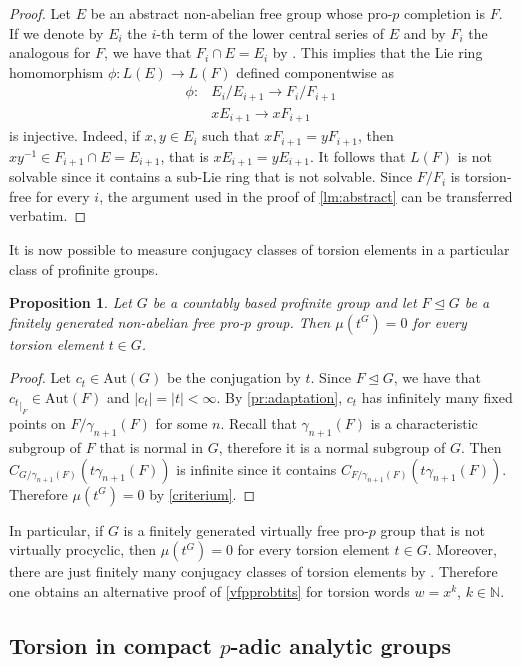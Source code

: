 \documentclass[a4paper,10pt]{amsart}
\theoremstyle{plain}
\newtheorem{proposition}[thm]{Proposition}
\theoremstyle{definition}
\newcommand{\bbN}{\mathbb{N}}
\numberwithin{equation}{section}
\begin{document}
	\begin{proof} 
		Let $E$ be an abstract non-abelian free group whose pro-$p$ completion is $F$. If we denote by $E_i$ the $i$-th term of the lower central series of $E$ and by $F_i$ the analogous for $F$, we have that $F_i\cap E=E_i$ by \cite[Lemma 2.6]{Lub82}. This implies that the Lie ring homomorphism $\phi\colon L(E)\to L(F)$ defined componentwise as
		\begin{align*}
			\phi\colon &E_i/E_{i+1}\to F_i/F_{i+1}\\
			& xE_{i+1}\to xF_{i+1}
		\end{align*}
	    is injective. Indeed, if $x,y\in E_i$ such that $xF_{i+1}=yF_{i+1}$, then $xy^{-1}\in F_{i+1}\cap E=E_{i+1}$, that is $xE_{i+1}=yE_{i+1}$. It follows that $L(F)$ is not solvable since it contains a sub-Lie ring that is not solvable. Since $F/F_i$ is torsion-free for every $i$, the argument used in the proof of \cref{lm:abstract} can be transferred verbatim.
	\end{proof}
	It is now possible to measure conjugacy classes of torsion elements in a particular class of profinite groups.
	\begin{proposition}\label{generalized}
		Let $G$ be a countably based profinite group and let $F\unlhd G$ be a finitely generated non-abelian free pro-$p$ group. Then $\mu(t^G)=0$ for every torsion element $t\in G$.
	\end{proposition}
	\begin{proof}
		Let $c_t\in\mathrm{Aut}(G)$ be the conjugation by $t$. Since $F\unlhd G$, we have that ${c_t}_{|_F}\in\mathrm{Aut}(F)$ and $|c_t|=|t|<\infty$. By \cref{pr:adaptation}, $c_t$ has infinitely many fixed points on $F/\gamma_{n+1}(F)$ for some $n$. Recall that $\gamma_{n+1}(F)$ is a characteristic subgroup of $F$ that is normal in $G$, therefore it is a normal subgroup of $G$. Then  $C_{G/\gamma_{n+1}(F)}(t\gamma_{n+1}(F))$ is infinite since it contains $C_{F/\gamma_{n+1}(F)}(t\gamma_{n+1}(F))$. Therefore $\mu(t^G)=0$ by \cref{criterium}.
	\end{proof}
	In particular, if $G$ is a finitely generated virtually free pro-$p$ group that is not virtually procyclic, then $\mu(t^G)=0$ for every torsion element $t\in G$. Moreover, there are just finitely many conjugacy classes of torsion elements by \cite[Lemma 8]{HZ08}. Therefore one obtains an alternative proof of \cref{vfpprobtits} for torsion words $w=x^k$, $k\in\bbN$.


\subsection{Torsion in compact \texorpdfstring{$p$}{p}-adic analytic groups}\label{subsec:p-adic_torsion}
\end{document}
